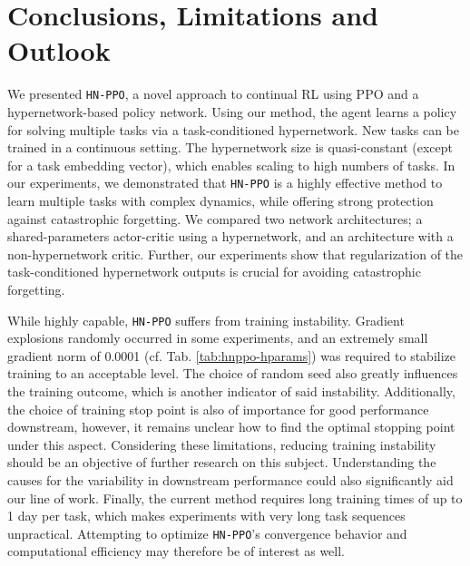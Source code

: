 \documentclass[dvipsnames]{article} %
\newcommand{\comment}[1]{}
\newcommand{\sa}[1] {\comment{{\color{cyan} SA: #1}}}                %
\newcommand{\jh}[1] {\comment{{\color{RawSienna} JH: #1}}}           %
\begin{document}
\section{Conclusions, Limitations and Outlook}
\label{chap:conclusion}
We presented \texttt{HN-PPO}, a novel approach to continual RL using PPO and a hypernetwork-based policy network. Using our method, the agent learns a policy for solving multiple tasks via a task-conditioned hypernetwork. New tasks can be trained in a continuous setting. The hypernetwork size is quasi-constant (except for a task embedding vector), which enables scaling to high numbers of tasks. In our experiments, we demonstrated that \texttt{HN-PPO} is a highly effective method to learn multiple tasks with complex dynamics, while offering strong protection against catastrophic forgetting. We compared two network architectures; a shared-parameters actor-critic using a hypernetwork, and an architecture with a non-hypernetwork critic. Further, our experiments show that regularization of the task-conditioned hypernetwork outputs is crucial for avoiding catastrophic forgetting. 

While highly capable, \texttt{HN-PPO} suffers from training instability. Gradient explosions randomly occurred in some experiments, and an extremely small gradient norm of 0.0001 (cf. Tab. \ref{tab:hnppo-hparams}) was required to stabilize training to an acceptable level. The choice of random seed also greatly influences the training outcome, which is another indicator of said instability. Additionally, the choice of training stop point is also of importance for good performance downstream, however, it remains unclear how to find the optimal stopping point under this aspect. Considering these limitations, reducing training instability should be an objective of further research on this subject. Understanding the causes for the variability in downstream performance could also significantly aid our line of work. Finally, the current method requires long training times of up to 1 day per task, which makes experiments with very long task sequences unpractical. Attempting to optimize \texttt{HN-PPO}'s convergence behavior and computational efficiency may therefore be of interest as well.
\end{document}
